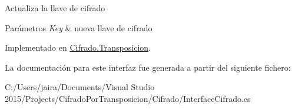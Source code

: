 Actualiza la llave de cifrado 


\begin{DoxyParams}{Parámetros}
{\em Key} & nueva llave de cifrado\\
\hline
\end{DoxyParams}


Implementado en \hyperlink{class_cifrado_1_1_transposicion_ab35db490c8543ccb453b4384ad4e236c}{Cifrado.\+Transposicion}.



La documentación para este interfaz fue generada a partir del siguiente fichero\+:\begin{DoxyCompactItemize}
\item 
C\+:/\+Users/jaira/\+Documents/\+Visual Studio 2015/\+Projects/\+Cifrado\+Por\+Transposicion/\+Cifrado/Interface\+Cifrado.\+cs\end{DoxyCompactItemize}
